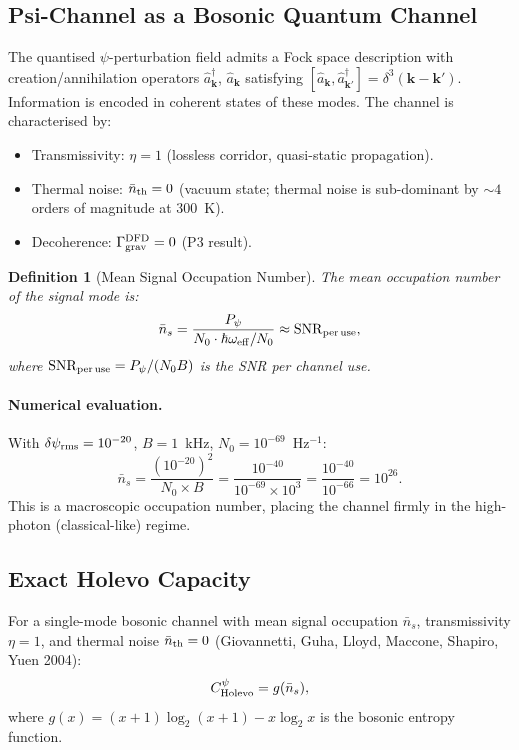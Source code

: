 \documentclass[aps,prd,twocolumn,superscriptaddress,nofootinbib]{revtex4-2}
\newcommand{\SNR}{\mathrm{SNR}}
\newtheorem{definition}{Definition}
\begin{document}
\subsection{Psi-Channel as a Bosonic Quantum Channel}

The quantised $\psi$-perturbation field admits a Fock space description
with creation/annihilation operators $\hat{a}_\mathbf{k}^\dagger$,
$\hat{a}_\mathbf{k}$ satisfying $[\hat{a}_\mathbf{k}, \hat{a}_{\mathbf{k}'}^\dagger]
= \delta^3(\mathbf{k}-\mathbf{k}')$. Information is encoded in coherent
states of these modes. The channel is characterised by:
\begin{itemize}
\item Transmissivity: $\eta = 1$ (lossless corridor, quasi-static propagation).
\item Thermal noise: $\bar{n}_{\rm th} = 0$ (vacuum state; thermal noise
is sub-dominant by $\sim 4$ orders of magnitude at 300~K).
\item Decoherence: $\Gamma_{\rm grav}^{\rm DFD} = 0$ (P3 result).
\end{itemize}

\begin{definition}[Mean Signal Occupation Number]
The mean occupation number of the signal mode is:
\begin{equation}
\bar{n}_s = \frac{P_\psi}{N_0 \cdot \hbar\omega_{\rm eff}/N_0}
\approx \SNR_{\rm per\,use},
\end{equation}
where $\SNR_{\rm per\,use} = P_\psi/(N_0 B)$ is the SNR per channel use.
\end{definition}

\paragraph{Numerical evaluation.}
With $\delta\psi_{\rm rms} = 10^{-20}$, $B = 1$~kHz, $N_0 = 10^{-69}$~Hz$^{-1}$:
\begin{equation}
\bar{n}_s = \frac{(10^{-20})^2}{N_0 \times B} = \frac{10^{-40}}{10^{-69} \times 10^3}
= \frac{10^{-40}}{10^{-66}} = 10^{26}.
\label{eq:nbar-numerical}
\end{equation}
This is a macroscopic occupation number, placing the channel firmly in the
high-photon (classical-like) regime.

\subsection{Exact Holevo Capacity}

For a single-mode bosonic channel with mean signal occupation $\bar{n}_s$,
transmissivity $\eta = 1$, and thermal noise $\bar{n}_{\rm th} = 0$
(Giovannetti, Guha, Lloyd, Maccone, Shapiro, Yuen 2004):
\begin{equation}
C_{\rm Holevo}^\psi = g(\bar{n}_s),
\label{eq:holevo}
\end{equation}
where $g(x) = (x+1)\log_2(x+1) - x\log_2 x$ is the bosonic entropy function.
\end{document}
